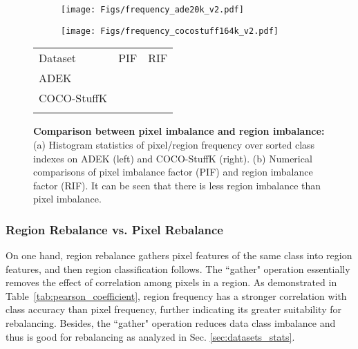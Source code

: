 \documentclass[final]{cvpr}
\begin{document}
\begin{figure*} 
\begin{center}
\begin{minipage}[t]{0.66\textwidth}
\footnotesize
\begin{center}
\begin{subfigure}[b]{0.5\linewidth}
\centering
\hspace{-12.5mm}
\texttt{[image: Figs/frequency\_ade20k\_v2.pdf]}
\end{subfigure}\begin{subfigure}[b]{0.5\linewidth}
\centering
\hspace{-12mm}
\texttt{[image: Figs/frequency\_cocostuff164k\_v2.pdf]}
\end{subfigure}
\end{center}
\end{minipage}
\begin{minipage}[t]{0.3\textwidth} 
\vspace{-1.2in}
\centering
\footnotesize
\setlength{\tabcolsep}{10pt}
\renewcommand{\arraystretch}{1.8}
{
\begin{tabular}{l|cc}
\shline
Dataset &PIF &RIF \\
\shline
ADEK          &  & \\
COCO-StuffK  & & \\
\shline
\end{tabular}
}
\label{tab:statistics_imbalance}
\end{minipage}
\end{center}
\vspace{-0.22in}
\caption{
\textbf{Comparison between pixel imbalance and region imbalance:}
(a) Histogram statistics of pixel/region frequency over sorted class indexes on ADEK (left) and COCO-StuffK (right).
(b) Numerical comparisons of
pixel imbalance factor (PIF) and region imbalance factor (RIF). It can be seen that there is less region imbalance than pixel imbalance.}
\label{fig:data_imbalance_seg}
\vspace{-0.15in}
\end{figure*}


\vspace{-0.1in}
\subsubsection{Region Rebalance vs. Pixel Rebalance}
\label{sec:region_rebalance_analysis}
On one hand, region rebalance gathers pixel features of the same class into region features, and then region classification follows. The ``gather" operation essentially removes the effect of correlation among pixels in a region. As demonstrated in Table~\ref{tab:pearson_coefficient}, region frequency has a stronger correlation with class accuracy than pixel frequency, further indicating its greater suitability for rebalancing. Besides, the ``gather" operation reduces data class imbalance and thus is good for rebalancing as analyzed in Sec. \ref{sec:datasets_stats}. 
\end{document}

